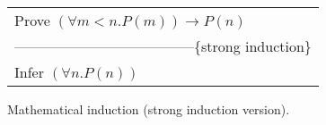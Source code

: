 \begin{figure}
\begin{center}
\begin{spacing}{0.9}
\begin{tabular}{l}
Prove $(\forall m<n.P(m))\rightarrow P(n)$ \\
--------------------------------------\{strong induction\}\\
Infer $(\forall n.P(n))$
\end{tabular}
\end{spacing}
\end{center}
\vspace*{-4mm}
\caption{Mathematical induction (strong induction version).}
\label{strong-induction-rule}
\end{figure}

